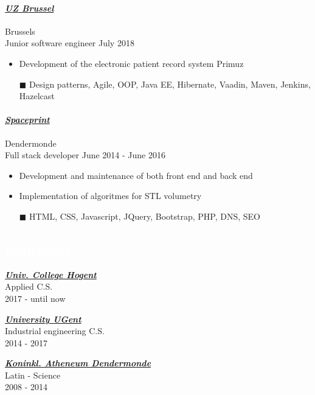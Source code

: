 \documentclass[a4paper, twoside]{article}
\begin{document}
\paragraph{\textbf{\textit{\href{https://uzbrussel.be }{\textcolor{blueDark}{ UZ Brussel }}}}} \hfill\small Brussels \\
Junior software engineer \hfill\small
July 2018
\begin{itemize}
\itemsep-0.2em
\item Development of the electronic patient record system Primuz
\item[\color{orange}$\blacksquare$] Design patterns, Agile, OOP, Java EE, Hibernate, Vaadin, Maven, Jenkins, Hazelcast
\end{itemize}
\paragraph{\textbf{\textit{\href{https:// }{\textcolor{blueDark}{ Spaceprint }}}}} \hfill\small Dendermonde \\
Full stack developer \hfill\small
June 2014
- June 2016
\begin{itemize}
\itemsep-0.2em
\item Development and maintenance of both front end and back end
\item Implementation of algoritmes for STL volumetry
\item[\color{orange}$\blacksquare$] HTML, CSS, Javascript, JQuery, Bootstrap, PHP, DNS, SEO
\end{itemize}
\begin{mdframed}
\section*{\textcolor{white}{ Education }}
\end{mdframed}
\begin{multicols}{ 3 }
\setlength{\parindent}{0pt}
\par
\textbf{\textit{\href{https://hogent.be }{\textcolor{blueDark}{ Univ. College Hogent }}}}\\
Applied C.S.\\ \small 2017 - until now
\setlength{\parindent}{0pt}
\par
\textbf{\textit{\href{https://ugent.be }{\textcolor{blueDark}{ University UGent }}}}\\
Industrial engineering C.S.\\ \small 2014 - 2017
\setlength{\parindent}{0pt}
\par
\textbf{\textit{\href{https://kad.be }{\textcolor{blueDark}{ Koninkl. Atheneum Dendermonde }}}}\\
Latin - Science\\ \small 2008 - 2014
\end{multicols}
\end{document}

